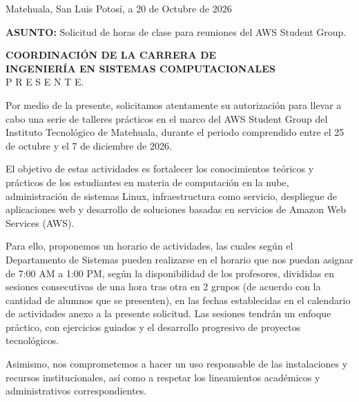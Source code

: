 \documentclass[12pt]{article}
\begin{document}
\begin{flushright}
Matehuala, San Luis Potosí, a 20 de Octubre de 2026
\end{flushright}

\vspace{1cm}

\textbf{ASUNTO:} Solicitud de horas de clase para reuniones del AWS Student Group.

\vspace{1cm}

\textbf{COORDINACIÓN DE LA CARRERA DE} \\
\textbf{INGENIERÍA EN SISTEMAS COMPUTACIONALES} \\
P R E S E N T E.

\vspace{1cm}

Por medio de la presente, solicitamos atentamente su autorización para llevar a cabo una serie de talleres prácticos en el marco del AWS Student Group del Instituto Tecnológico de Matehuala, durante el periodo comprendido entre el 25 de octubre y el 7 de diciembre de 2026.

El objetivo de estas actividades es fortalecer los conocimientos teóricos y prácticos de los estudiantes en materia de computación en la nube, administración de sistemas Linux, infraestructura como servicio, despliegue de aplicaciones web y desarrollo de soluciones basadas en servicios de Amazon Web Services (AWS).

Para ello, proponemos un horario de actividades, las cuales según el Departamento de Sistemas pueden realizarse en el horario que nos puedan asignar de 7:00 AM a 1:00 PM, según la disponibilidad de los profesores, divididas en sesiones consecutivas de una hora tras otra en 2 grupos (de acuerdo con la cantidad de alumnos que se presenten), en las fechas establecidas en el calendario de actividades anexo a la presente solicitud. Las sesiones tendrán un enfoque práctico, con ejercicios guiados y el desarrollo progresivo de proyectos tecnológicos.

Asimismo, nos comprometemos a hacer un uso responsable de las instalaciones y recursos institucionales, así como a respetar los lineamientos académicos y administrativos correspondientes.
\end{document}
